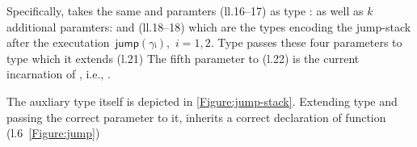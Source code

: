 Specifically,  takes 
the same  and  paramters (ll.16--17) as type :
  as well as $k$ additional paramters:
   and  (ll.18--18)
which are the types encoding the jump-stack
  after the executation~$\textsf{jump}(γᵢ)$,~$i=1,2$.
Type  passes these four parameters 
to type  which it extends (l.21)
The fifth parameter to  (l.22) is the current incarnation of , i.e., 
  .

The auxliary type  itself is depicted in \cref{Figure:jump-stack}.
Extending type  and passing the correct  parameter to it, 
 inherits a correct declaration of function  (l.6~\cref{Figure:jump}) 

